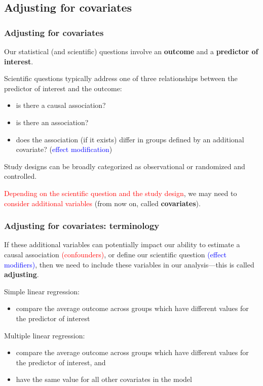 \documentclass[12pt, 
hyperref={colorlinks=true, linkcolor=blue, urlcolor=cyan},dvipsnames]{beamer}
\begin{document}
\subsection{Adjusting for covariates}
\begin{frame}
\frametitle{Adjusting for covariates}

Our statistical (and scientific) questions involve an \textbf{outcome} and a \textbf{predictor of interest}.

Scientific questions typically address one of three relationships between the predictor of interest and the outcome: \vspace{-0.2cm}
\begin{itemize}
\item is there a causal association?
\item is there an association?
\item does the association (if it exists) differ in groups defined by an additional covariate? (\textcolor{blue}{effect modification})
\end{itemize}

Study designs can be broadly categorized as observational or randomized and controlled.

\textcolor{red}{Depending on the scientific question and the study design}, we may need to \textcolor{red}{consider additional variables} (from now on, called \textbf{covariates}).

\end{frame}

\begin{frame}
\frametitle{Adjusting for covariates: terminology}

If these additional variables can potentially impact our ability to estimate a causal association \textcolor{red}{(confounders)}, or define our scientific question \textcolor{blue}{(effect modifiers)}, then we need to include these variables in our analysis---this is called \textbf{adjusting}.

Simple linear regression: 
\begin{itemize}
\item compare the average outcome across groups which have different values for the predictor of interest
\end{itemize}

Multiple linear regression:
\begin{itemize}
\item compare the average outcome across groups which have different values for the predictor of interest, \pause and 
\item have the same value for all other covariates in the model
\end{itemize}
\end{frame}
\end{document}
